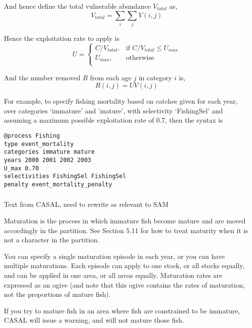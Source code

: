 And hence define the total vulnerable abundance $V_{total}$ as,
\begin{equation}
  V_{total}  = \sum\limits_i {\sum\limits_j {V(i,j)}} 
\end{equation}

Hence the exploitation rate to apply is 
\begin{equation}
U = \begin{cases}
  C/V_{total}, & \text{if $C/V_{total} \leq U_{max}$} \\
  U_{max}, & \text{otherwise}\\ 
  \end{cases} 
\end{equation}

And the number removed $R$ from each age $j$ in category $i$ is,
\begin{equation}
  R(i,j) = UV(i,j)
\end{equation}

For example, to specify fishing mortality based on catches given for each year, over categories `immature' and 'mature', with selectivity `FishingSel' and assuming a maximum possible exploitation rate of 0.7, then the syntax is

{\small{\begin{verbatim}
@process Fishing
type event_mortality
categories immature mature
years 2000 2001 2002 2003
U_max 0.70
selectivities FishingSel FishingSel
penalty event_mortality_penalty
\end{verbatim}}}

\subsubsection{}
\KL Text from CASAL, need to rewrite as relevant to SAM \KLend

Maturation is the process in which immature fish become mature and are moved accordingly in the partition. See Section 5.11 for how to treat maturity when it is not a character in the partition.

You can specify a single maturation episode in each year, or you can have multiple maturations. Each episode can apply to one stock, or all stocks equally, and can be applied in one area, or all areas equally. Maturation rates are expressed as an ogive (and note that this ogive contains the rates of maturation, not the proportions of mature fish).

If you try to mature fish in an area where fish are constrained to be immature, CASAL will issue a warning, and will not mature those fish.

